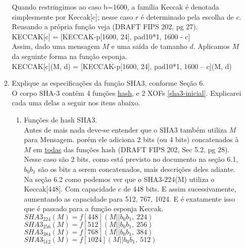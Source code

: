 \documentclass[12pt, a4paper]{article}
\begin{document}
\begin{enumerate}
\begin{enumerate}
Quando restringimos ao caso b=1600, a família Keccak é denotada simplesmente
por Keccak[c]; nesse caso $r$ é determinado pela escolha de $c$. Reusando a
própria função veja (DRAFT FIPS 202, pg 27).\\

KECCAK[c] = [KECCAK-p[1600, 24], pad10*1, 1600 - c]\\

Assim, dado uma mensagem $M$ e uma saída de tamanho $d$. Aplicamos $M$ da
seguinte forma na função esponja.\\

KECCAK[c](M, d) = [KECCAK-p[1600, 24], pad10*1, 1600 – c](M,
d)\\

\item Explique as especificações da função SHA3, conforme Seção 6.\\

O corpo SHA-3 contém 4 funções \underline{hash}, e 2 XOFs \ref{sha3-inicial}.
Explicarei cada uma delas a seguir nos itens abaixo.\\

\begin{enumerate}

\item Funções de hash SHA3.\\

Antes de mais nada deve-se entender que o SHA3 também utiliza $M$ para Mensagem.
porém ele adiciona 2 bits (ou 4 bits) concatenados à $M$ em \underline{todas}
das funções hash (DRAFT FIPS 202, Sec 5.2, pg 28). Nesse caso são 2 bits, como
está previsto no documento na seção 6.1, $b_{0}b_{1}$ são os bits a serem
concatenados, mais descrições deles adiante.\\

Na seção 6.2 como podemos ver que o SHA3-224(M) utiliza o
Keccak[448]. Com capacidade $c$ de 448 bits. E assim sucessivamente, aumentando
as capacidade para 512, 767, 1024. E é exatamente isso que é passado para a
função esponja Keccak.\\

$SHA3_{224}(M) = f[448](M || b_{0}b_{1},\ 224)$\\

$SHA3_{256}(M) = f[512](M || b_{0}b_{1},\ 256)$\\

$SHA3_{384}(M) = f[768](M || b_{0}b_{1},\ 384)$\\

$SHA3_{512}(M) = f[1024](M || b_{0}b_{1},\ 512)$\\


\end{enumerate}
\end{enumerate}
\end{enumerate}
\end{document}
